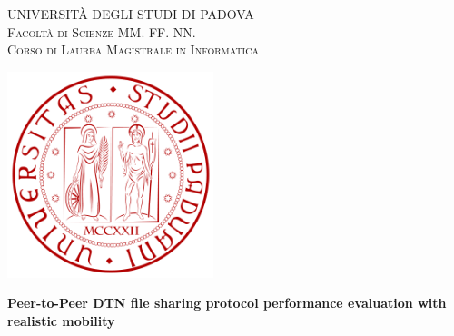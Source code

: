 
\begin{titlepage}
    \begin{center}
        {\Large UNIVERSITÀ DEGLI STUDI DI PADOVA}\\
        \vspace{0.2cm}                                                  %
        {\Large \scshape Facoltà di Scienze MM. FF. NN.}\\
        \vspace{2mm}
        {\Large \scshape Corso di Laurea Magistrale in Informatica}\\
        \vspace{2mm}                                                      %
        
        \vspace{0.3cm}
        \includegraphics[width=6cm]{figure/unipd_logo}\\
        \vspace{2cm}
        
        \vspace{2cm}
        {\LARGE \bfseries Peer-to-Peer DTN file sharing protocol performance evaluation  with realistic mobility} \\
        \vspace{2.5cm}
    \end{center}


\end{titlepage}
